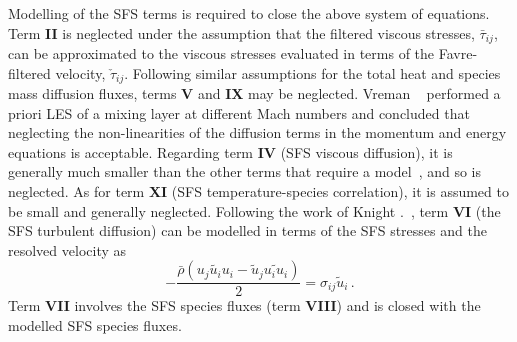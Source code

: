 Modelling of the SFS terms is required to close the above system of equations. Term \textbf{II} is neglected under the assumption that the filtered viscous stresses, $\bar{\tau}_{ij}$, can be approximated to the viscous stresses evaluated in terms of the Favre-filtered velocity, $\check{\tau}_{ij}$. Following similar assumptions for the total heat and species mass diffusion fluxes, terms \textbf{V} and
\textbf{IX} may be neglected. Vreman \etal ~\cite{vreman:1995} performed a priori LES of a mixing layer at different Mach numbers and concluded that neglecting the non-linearities of the diffusion terms in the momentum and energy equations is acceptable. Regarding term \textbf{IV} (SFS viscous diffusion), it is generally much smaller than the other terms that require a model~\cite{martin:2000}, and so is neglected. As for term \textbf{XI} (SFS temperature-species correlation), it is assumed to be small and generally neglected.
%
Following the work of Knight \etal.~\cite{knight:1998}, term \textbf{VI} (the SFS turbulent diffusion) can be modelled in terms of the SFS stresses and the resolved velocity as
%
\begin{equation}
  - \frac{\bar{\rho} \left(\widetilde{u_j u_i u_i} - \tilde{u}_j\widetilde{u_i u_i} \right)}{2} 
  = \sigma_{ij}\tilde{u}_i \,.
\end{equation}
%
Term \textbf{VII} involves the SFS species fluxes (term \textbf{VIII}) and is closed with the modelled SFS species fluxes. 



